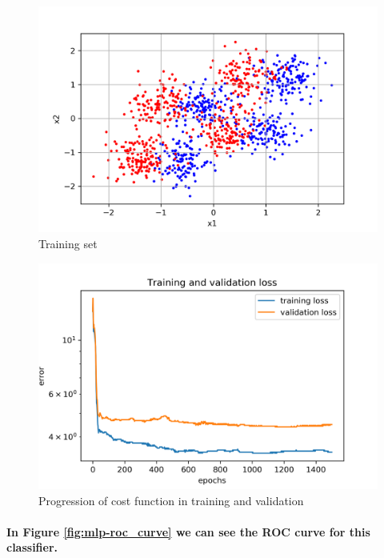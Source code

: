 \documentclass[a4paper]{article}    %
\begin{document}
\begin{figure}[H]
    \centering
    \includegraphics[width=12cm]{raw_data}
    \caption{Training set}
    \label{fig:mlp-raw_data}
\end{figure}

\begin{figure}[H]
    \centering
    \includegraphics[width=12cm]{training_validation_loss}
    \caption{Progression of cost function in training and validation}
    \label{fig:mlp-training_validation_loss}
\end{figure}

\paragraph{In Figure \ref{fig:mlp-roc_curve} we can see the ROC curve for this classifier.}
\end{document}
